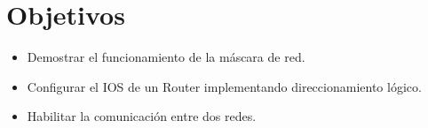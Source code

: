 \section*{Objetivos}

{
    \renewcommand{\labelitemi}{$\triangleright$}
    \begin{itemize}
        \item Demostrar el funcionamiento de la m\'ascara de red.
        \item Configurar el IOS de un Router implementando direccionamiento l\'ogico.
        \item Habilitar la comunicaci\'on entre dos redes.
    \end{itemize}
}